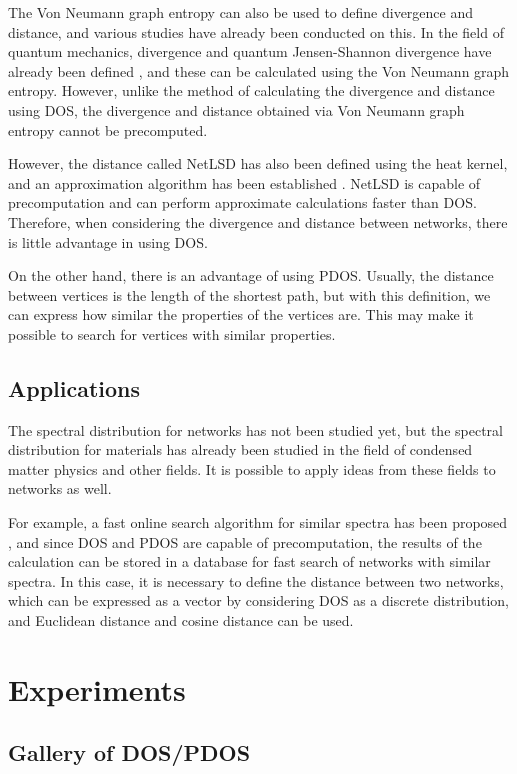 \documentclass[senior,final,11pt]{iscs-thesis}
\begin{document}
The Von Neumann graph entropy can also be used to define divergence and distance, and various studies have already been conducted on this. In the field of quantum mechanics, divergence and quantum Jensen-Shannon divergence have already been defined \cite{briet2009properties, lamberti2008metric}, and these can be calculated using the Von Neumann graph entropy. However, unlike the method of calculating the divergence and distance using DOS, the divergence and distance obtained via Von Neumann graph entropy cannot be precomputed.

However, the distance called NetLSD has also been defined using the heat kernel, and an approximation algorithm has been established \cite{tsitsulin2018netlsd,tsitsulin2020just}. NetLSD is capable of precomputation and can perform approximate calculations faster than DOS. Therefore, when considering the divergence and distance between networks, there is little advantage in using DOS.

On the other hand, there is an advantage of using PDOS. Usually, the distance between vertices is the length of the shortest path, but with this definition, we can express how similar the properties of the vertices are. This may make it possible to search for vertices with similar properties.

\subsection{Applications}
The spectral distribution for networks has not been studied yet, but the spectral distribution for materials has already been studied in the field of condensed matter physics and other fields. It is possible to apply ideas from these fields to networks as well.

For example, a fast online search algorithm for similar spectra has been proposed \cite{borysov2018online,geilhufe2018towards}, and since DOS and PDOS are capable of precomputation, the results of the calculation can be stored in a database for fast search of networks with similar spectra. In this case, it is necessary to define the distance between two networks, which can be expressed as a vector by considering DOS as a discrete distribution, and Euclidean distance and cosine distance can be used.

\section{Experiments}
\subsection{Gallery of DOS/PDOS}
\end{document}
